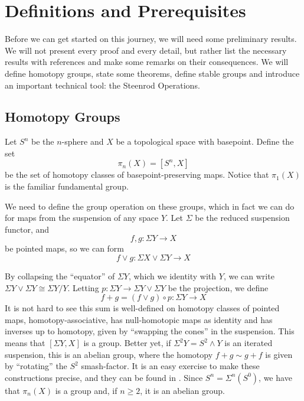 \section{Definitions and Prerequisites}


Before we can get started on this journey, we will need some preliminary results.  
We will not present every proof and every detail, but rather list the necessary results with references and make some remarks on their consequences. 
We will define homotopy groups, state some theorems, define stable groups and introduce an important technical tool: the Steenrod Operations.

\subsection{Homotopy Groups}

\label{sec:HomotopyIntro}

\begin{Def}
  Let $S^n$ be the $n$-sphere and $X$ be a topological space with basepoint.  
  Define the set 
  \[\pi_n(X)=[S^n,X]\]
  be the set of homotopy classes of basepoint-preserving maps.  
  Notice that $\pi_1(X)$ is the familiar fundamental group.  
\end{Def}

We need to define the group operation on these groups, which in fact we can do for maps from the suspension of any space $Y$.  
Let $\Sigma$ be the reduced suspension functor, and 
\[f,g:\Sigma Y\to X\]
be pointed maps, so we can form
\[f\vee g :\Sigma X\vee \Sigma Y\to X\]

By collapsing the ``equator'' of $\Sigma Y$, which we identity with $Y$, we can write $\Sigma Y\vee \Sigma Y\cong \Sigma Y/Y$.  
Letting $p: \Sigma Y\to \Sigma Y\vee \Sigma Y$ be the projection, we define
\[f+g=(f\vee g)\circ p : \Sigma Y\to X\]
It is not  hard to see this sum is well-defined on homotopy classes of pointed maps, homotopy-associative, has null-homotopic maps as identity and 
has inverses up to homotopy, given by ``swapping the cones'' in the suspension.
This means that $[\Sigma Y,X]$ is a group.  
Better yet, if $\Sigma^2Y=S^2\wedge Y$ is an iterated suspension, this is an abelian group, where the homotopy $f+g\sim g+f$ is given by ``rotating'' the $S^2$ smash-factor.  
It is an easy exercise to make these constructions precise, and they can be found in \cite{HatcherAT}.  Since $S^n=\Sigma^n(S^0)$, we have that $\pi_n(X)$ is a group and, if $n\ge 2$, it is an abelian group.  

